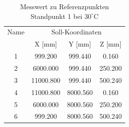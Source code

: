 \begin{table}[h]\label{tab:ausdehnung2}
\centering
\caption{Messwert zu Referenzpunkten Standpunkt 1 bei $30^\circ\text{C}$}

\begin{tabular}{cccc}
\toprule
\multicolumn{1}{c|}{Name} &
\multicolumn{3}{c}{Soll-Koordinaten} \\
\multicolumn{1}{c|}{} &
\multicolumn{1}{c|}{X [mm]} &
\multicolumn{1}{c|}{Y [mm]} &
\multicolumn{1}{c}{Z [mm]} \\
\midrule

\multicolumn{1}{c|}{1} &
\multicolumn{1}{c|}{999.200} &
\multicolumn{1}{c|}{999.440} &
\multicolumn{1}{c}{0.160} \\

\multicolumn{1}{c|}{2} &
\multicolumn{1}{c|}{6000.000} &
\multicolumn{1}{c|}{999.440} &
\multicolumn{1}{c}{250.200} \\

\multicolumn{1}{c|}{3} &
\multicolumn{1}{c|}{11000.800} &
\multicolumn{1}{c|}{999.440} &
\multicolumn{1}{c}{500.240} \\

\multicolumn{1}{c|}{4} &
\multicolumn{1}{c|}{11000.800} &
\multicolumn{1}{c|}{8000.560} &
\multicolumn{1}{c}{0.160} \\

\multicolumn{1}{c|}{5} &
\multicolumn{1}{c|}{6000.000} &
\multicolumn{1}{c|}{8000.560} &
\multicolumn{1}{c}{250.200} \\

\multicolumn{1}{c|}{6} &
\multicolumn{1}{c|}{999.200} &
\multicolumn{1}{c|}{8000.560} &
\multicolumn{1}{c}{500.240} \\
\bottomrule
\end{tabular}
\end{table}

